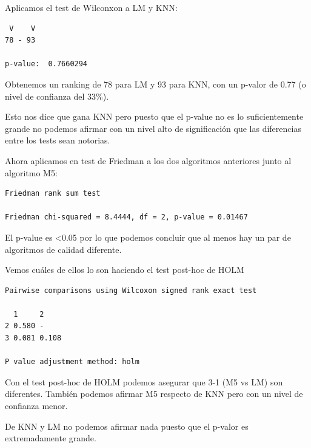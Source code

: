\vspace{\baselineskip}

Aplicamos el test de Wilconxon a LM y KNN:
\begin{verbatim}
 V    V
78 - 93 

p-value:  0.7660294
\end{verbatim}

Obtenemos un ranking de 78 para LM y 93 para KNN, con un p-valor de 0.77 (o nivel de confianza del 33\%).

Esto nos dice que gana KNN pero puesto que el p-value no es lo suficientemente grande no podemos afirmar con un nivel alto de significación que las diferencias entre los tests sean notorias.

\vspace{\baselineskip}

Ahora aplicamos en test de Friedman a los dos algoritmos anteriores junto al algoritmo M5:
\begin{verbatim}
Friedman rank sum test

Friedman chi-squared = 8.4444, df = 2, p-value = 0.01467
\end{verbatim}

El p-value es \textless0.05 por lo que podemos concluir que al menos hay un par de algoritmos de calidad diferente.

\vspace{\baselineskip}

Vemos cuáles de ellos lo son haciendo el test post-hoc de HOLM
\begin{verbatim}
Pairwise comparisons using Wilcoxon signed rank exact test 

  1     2    
2 0.580 -    
3 0.081 0.108

P value adjustment method: holm 
\end{verbatim}

Con el test post-hoc de HOLM podemos asegurar que 3-1 (M5 vs LM) son diferentes. También podemos afirmar M5 respecto de KNN pero con un nivel de confianza menor.

\vspace{\baselineskip}

De KNN y LM no podemos afirmar nada puesto que el p-valor es extremadamente grande.